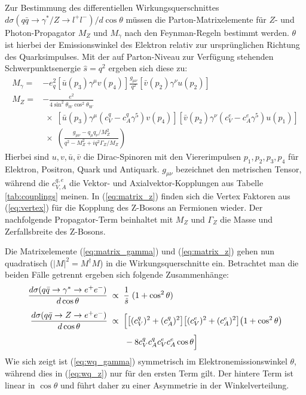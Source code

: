 Zur Bestimmung des differentiellen Wirkungsquerschnittes
$d\sigma(q\bar q \rightarrow \gamma^*/Z \rightarrow l^+l^-)/d\cos\theta$
müssen die Parton-Matrixelemente für $Z$- und Photon-Propagator $M_Z$ und
$M_\gamma$ nach den Feynman-Regeln bestimmt werden. $\theta$ ist hierbei der
Emissionswinkel des Elektron relativ zur ursprünglichen Richtung des
Quarksimpulses. Mit der auf Parton-Niveau zur Verfügung stehenden
Schwerpunktsenergie $\hat s=q^2$ ergeben sich diese zu:
\begin{align}
    M_\gamma = &-e_q^2
                \left[ \bar u(p_3) \gamma^\mu v(p_4) \right]
                \frac{g_{\mu\nu}}{q^2}
                \left[ \bar v(p_2) \gamma^\nu u(p_2) \right]
                \label{eq:matrix_gamma} \\[5pt]
    M_Z      = &-\frac{e^2}{4\sin^2\theta_W\cos^2\theta_W}
                \nonumber \\[3pt] &\;\times\;
                \left[ \bar u(p_3)\gamma^\mu(c_V^q-c_A^q\gamma^5)v(p_4)\right]
                \left[ \bar v(p_2)\gamma^\nu(c_V^e-c_A^e\gamma^5)u(p_1)\right]
                \label{eq:matrix_z} \\ &\;\times\;
                \left( \frac{g_{\mu\nu} - q_\mu q_\nu/M_Z^2}{q^2 - M_Z^2 +iq^2
                \Gamma_Z/M_Z}  \right) \nonumber
\end{align}
Hierbei sind $u,v,\bar u, \bar v$ die Dirac-Spinoren mit den Viererimpulsen
$p_1,p_2,p_3,p_4$ für Elektron, Positron, Quark und Antiquark. $g_{\mu\nu}$
bezeichnet den metrischen Tensor, während die $c_{V,A}^{q,e}$ die Vektor- und
Axialvektor-Kopplungen aus Tabelle \ref{tab:couplings} meinen. In
(\ref{eq:matrix_z}) finden sich die Vertex Faktoren aus (\ref{eq:vertex}) für
die Kopplung des Z-Bosons an Fermionen wieder. Der nachfolgende Propagator-Term
beinhaltet mit $M_Z$ und $\Gamma_Z$ die Masse und Zerfallsbreite des Z-Bosons.

Die Matrixelemente (\ref{eq:matrix_gamma}) und (\ref{eq:matrix_z}) gehen nun
quadratisch ($|M|^2=M^\dagger M$) in die Wirkungsquerschnitte ein. Betrachtet
man die beiden Fälle getrennt ergeben sich folgende Zusammenhänge:
\begin{align}
    \frac{d\sigma(q\bar q\rightarrow \gamma^* \rightarrow e^+e^-)}{d\cos\theta}
        &\;\propto\; \frac{1}{\hat s}\;(1+\cos^2\theta)
        \label{eq:wq_gamma} \\[5pt]
    \frac{d\sigma(q\bar q\rightarrow Z \rightarrow e^+e^-)}{d\cos\theta}
        &\;\propto\;
            \Bigl[
                \bigl[ (c_V^q)^2 + (c_A^q)^2 \bigr]
                \bigl[ (c_V^e)^2 + (c_A^e)^2 \bigr]
                \bigl( 1 + \cos^2\theta      \bigr)
                \nonumber \\[3pt] & \qquad
                - 8 c_V^q c_A^q c_V^e c_A^e \cos\theta
            \Bigr]
            \label{eq:wq_z}
\end{align}
Wie sich zeigt ist (\ref{eq:wq_gamma}) symmetrisch im Elektronemissionswinkel
$\theta$, während dies in (\ref{eq:wq_z}) nur für den ersten Term gilt. Der
hintere Term ist linear in $\cos\theta$ und führt daher zu einer Asymmetrie in
der Winkelverteilung.

